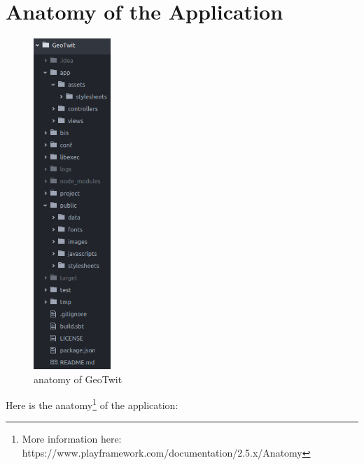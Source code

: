 \documentclass[a4paper,11pt]{report}
\begin{document}
\section{Anatomy of the Application}
\begin{figure}
\vspace{-25pt}
\begin{center}
\includegraphics[width=0.26\textwidth]{figures/anatomy.png}
\caption{anatomy of GeoTwit}
\end{center}
\vspace{-100pt}
\end{figure}
Here is the anatomy\footnote{More information here: https://www.playframework.com/documentation/2.5.x/Anatomy} of the application:
\end{document}

